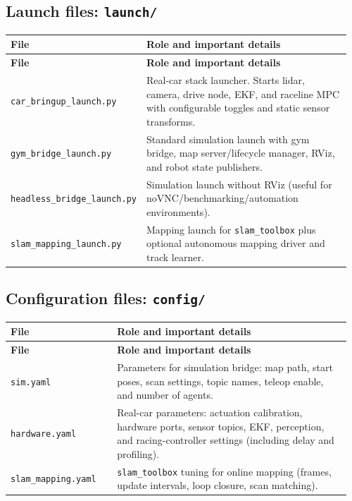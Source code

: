 \documentclass[11pt]{article}
\begin{document}
\subsection{Launch files: \texttt{launch/}}
\begin{longtable}{p{0.30\linewidth}p{0.66\linewidth}}
\toprule
\textbf{File} & \textbf{Role and important details} \\
\midrule
\endfirsthead
\toprule
\textbf{File} & \textbf{Role and important details} \\
\midrule
\endhead
\texttt{car\_bringup\_launch.py} & Real-car stack launcher. Starts lidar, camera, drive node, EKF, and raceline MPC with configurable toggles and static sensor transforms. \\
\texttt{gym\_bridge\_launch.py} & Standard simulation launch with gym bridge, map server/lifecycle manager, RViz, and robot state publishers. \\
\texttt{headless\_bridge\_launch.py} & Simulation launch without RViz (useful for noVNC/benchmarking/automation environments). \\
\texttt{slam\_mapping\_launch.py} & Mapping launch for \texttt{slam\_toolbox} plus optional autonomous mapping driver and track learner. \\
\bottomrule
\end{longtable}

\subsection{Configuration files: \texttt{config/}}
\begin{longtable}{p{0.30\linewidth}p{0.66\linewidth}}
\toprule
\textbf{File} & \textbf{Role and important details} \\
\midrule
\endfirsthead
\toprule
\textbf{File} & \textbf{Role and important details} \\
\midrule
\endhead
\texttt{sim.yaml} & Parameters for simulation bridge: map path, start poses, scan settings, topic names, teleop enable, and number of agents. \\
\texttt{hardware.yaml} & Real-car parameters: actuation calibration, hardware ports, sensor topics, EKF, perception, and racing-controller settings (including delay and profiling). \\
\texttt{slam\_mapping.yaml} & \texttt{slam\_toolbox} tuning for online mapping (frames, update intervals, loop closure, scan matching). \\
\bottomrule
\end{longtable}
\end{document}
